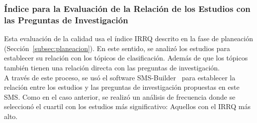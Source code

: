 \subsubsection{Índice para la Evaluación de la Relación de los Estudios con las Preguntas de Investigación}
Esta evaluación de la calidad usa el índice IRRQ descrito en la fase de planeación (Sección~\ref{subsec:planeacion}). En este sentido, se analizó los estudios para establecer su relación con los tópicos de clasificación. Además de que los tópicos también tienen una relación directa con las preguntas de investigación.\\
A través de este proceso, se usó el software SMS-Builder~\cite{candela2020smsbuilder} para establecer la relación entre los estudios y las preguntas de investigación propuestas en este SMS. Como en el caso anterior, se realizó un análisis de frecuencia donde se seleccionó el cuartil con los estudios más significativo: Aquellos con el IRRQ más alto.\\
\mbox{}\\